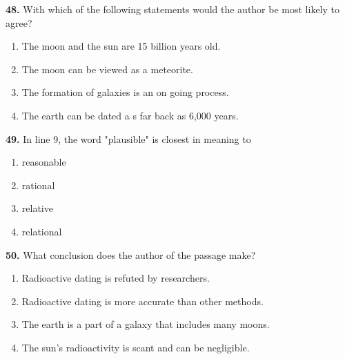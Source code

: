 \documentclass[12pt]{article}
\begin{document}
\vspace{0.25\baselineskip}
\noindent\textbf{48.} With which of the following statements would the author be most likely to agree?
\begin{enumerate}[label=(\Alph*),leftmargin=*,itemsep=0.2em]
\item The moon and the sun are 15 billion years old.
\item The moon can be viewed as a meteorite.
\item The formation of galaxies is an on going process.
\item The earth can be dated a s far back as 6,000 years.
\end{enumerate}
\par
\vspace{0.25\baselineskip}
\noindent\textbf{49.} In line 9, the word "plausible" is closest in meaning to
\begin{enumerate}[label=(\Alph*),leftmargin=*,itemsep=0.2em]
\item reasonable
\item rational
\item relative
\item relational
\end{enumerate}
\par
\vspace{0.25\baselineskip}
\noindent\textbf{50.} What conclusion does the author of the passage make?
\begin{enumerate}[label=(\Alph*),leftmargin=*,itemsep=0.2em]
\item Radioactive dating is refuted by researchers.
\item Radioactive dating is more accurate than other methods.
\item The earth is a part of a galaxy that includes many moons.
\item The sun's radioactivity is scant and can be negligible.
\end{enumerate}
\par
\vspace{0.25\baselineskip}
\end{document}
